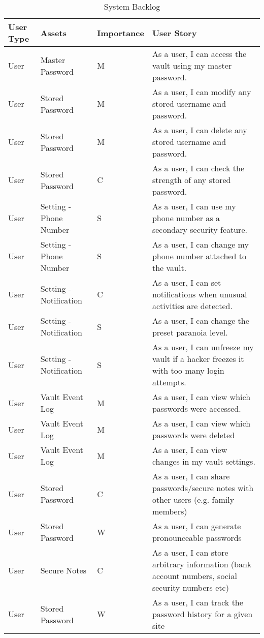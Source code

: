 \documentclass{article}
\begin{document}
\begin{table}[H]
  \centering
  {
    \renewcommand\arraystretch{1.25}
    \begin{tabular}{>{\centering}m{1cm} >{\centering}m{4cm} >{\centering}m{2cm} >{\centering\arraybackslash}m{8cm} }
    \toprule
    User Type & Assets & Importance & User Story \\
    \midrule
    User & Master Password & M & As a user, I can access the vault using my master password. \\
    User & Stored Password & M & As a user, I can modify any stored username and password. \\
    User & Stored Password & M & As a user, I can delete any stored username and password. \\
    User & Stored Password & C & As a user, I can check the strength of any stored password. \\
    User & Setting - Phone Number & S & As a user, I can use my phone number as a secondary security feature. \\
    User & Setting - Phone Number & S & As a user, I can change my phone number attached to the vault. \\
    User & Setting - Notification & C & As a user, I can set notifications when unusual activities are detected. \\
    User & Setting - Notification & S &  As a user, I can change the preset paranoia level. \\
    User & Setting - Notification & S & As a user, I can unfreeze my vault if a hacker freezes it with too many login attempts. \\
    User & Vault Event Log & M & As a user, I can view which passwords were accessed. \\
    User & Vault Event Log & M & As a user, I can view which passwords were deleted \\
    User & Vault Event Log & M & As a user, I can view changes in my vault settings. \\
    User & Stored Password & C & As a user, I can share passwords/secure notes with other users (e.g. family members) \\
    User & Stored Password & W & As a user, I can generate pronounceable passwords \\
    User & Secure Notes & C & As a user, I can store arbitrary information (bank account numbers, social security numbers etc) \\
    User & Stored Password & W & As a user, I can track the password history for a given site \\
    \bottomrule
    \end{tabular}
  }
  \caption{System Backlog}
  \label{tab:system_backlog}
\end{table}
\end{document}
